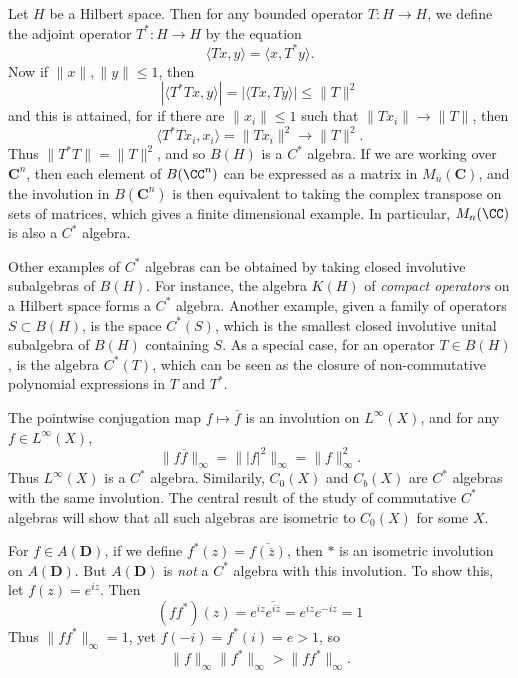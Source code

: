 \begin{example}
    Let $H$ be a Hilbert space. Then for any bounded operator $T: H \to H$, we define the adjoint operator $T^*: H \to H$ by the equation
    \[ \langle Tx, y \rangle = \langle x, T^* y \rangle. \]
    Now if $\| x \|, \| y \| \leq 1$, then
    \[ | \langle T^* T x, y \rangle | = | \langle Tx, Ty \rangle | \leq \| T \|^2 \]
    and this is attained, for if there are $\| x_i \| \leq 1$ such that $\| Tx_i \| \to \| T \|$, then
    \[ \langle T^* T x_i, x_i \rangle = \| Tx_i \|^2 \to \| T \|^2. \]
    Thus $\| T^* T \| = \| T \|^2$, and so $B(H)$ is a $C^*$ algebra. If we are working over $\mathbf{C}^n$, then each element of $B(\CC^n)$ can be expressed as a matrix in $M_n(\mathbf{C})$, and the involution in $B(\mathbf{C}^n)$ is then equivalent to taking the complex transpose on sets of matrices, which gives a finite dimensional example. In particular, $M_n(\CC)$ is also a $C^*$ algebra.
\end{example}

\begin{example}
    Other examples of $C^*$ algebras can be obtained by taking closed involutive subalgebras of $B(H)$. For instance, the algebra $K(H)$ of \emph{compact operators} on a Hilbert space forms a $C^*$ algebra. Another example, given a family of operators $S \subset B(H)$, is the space $C^*(S)$, which is the smallest closed involutive unital subalgebra of $B(H)$ containing $S$. As a special case, for an operator $T \in B(H)$, is the algebra $C^*(T)$, which can be seen as the closure of non-commutative polynomial expressions in $T$ and $T^*$.
\end{example}

\begin{example}
    The pointwise conjugation map $f \mapsto \overline{f}$ is an involution on $L^\infty(X)$, and for any $f \in L^\infty(X)$,
    \[ \| f \overline{f} \|_\infty = \| |f|^2 \|_\infty = \| f \|^2_\infty. \]
    Thus $L^\infty(X)$ is a $C^*$ algebra. Similarily, $C_0(X)$ and $C_b(X)$ are $C^*$ algebras with the same involution. The central result of the study of commutative $C^*$ algebras will show that all such algebras are isometric to $C_0(X)$ for some $X$.
\end{example}

\begin{example}
    For $f \in A(\mathbf{D})$, if we define $f^*(z) = \overline{f(\overline{z})}$, then $*$ is an isometric involution on $A(\mathbf{D})$. But $A(\mathbf{D})$ is \emph{not} a $C^*$ algebra with this involution. To show this, let $f(z) = e^{iz}$. Then
    \[ (ff^*)(z) = e^{iz} \overline{e^{i\overline{z}}} = e^{iz} e^{-iz} = 1 \]
    Thus $\| f f^* \|_\infty = 1$, yet $f(-i) = f^*(i) = e > 1$, so
    \[ \| f \|_\infty \| f^* \|_\infty > \| ff^* \|_\infty. \]
\end{example}

